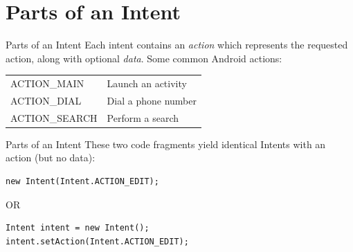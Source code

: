 \documentclass[aspectratio=169]{beamer}
\begin{document}
\section*{Parts of an Intent}



\begin{frame}{Parts of an Intent}
\Large
Each intent contains an \emph{action} which represents the requested
action, along with optional \emph{data}. Some common Android actions: \\
\vspace{2em}
\hspace*{2em} \begin{tabular}{ll}
ACTION\_MAIN & Launch an activity \\
ACTION\_DIAL & Dial a phone number \\
ACTION\_SEARCH & Perform a search
\end{tabular}
\end{frame}



\begin{frame}[fragile]{Parts of an Intent}
\large
These two code fragments yield identical Intents with an action (but no data): \\
\normalsize
\begin{Verbatim}
new Intent(Intent.ACTION_EDIT);
\end{Verbatim}
OR \\
\begin{Verbatim}
Intent intent = new Intent();
intent.setAction(Intent.ACTION_EDIT);
\end{Verbatim}
\end{frame}
\end{document}
